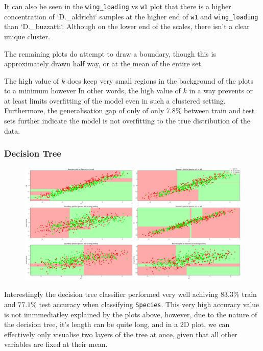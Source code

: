 \documentclass{article}
\begin{document}
It can also be seen in the \texttt{wing_loading} vs \texttt{w1} plot that there is a higher concentration of `D._aldrichi` samples at the higher end of \texttt{w1} and \texttt{wing_loading} than `D._buzzatti`. Although on the lower end of the scales, there isn't a clear unique cluster. 

The remaining plots do attempt to draw a boundary, though this is approximately drawn half way, or at the mean of the entire set.

The high value of $k$ does keep very small regions in the background of the plots to a minimum however In other words, the high value of $k$ in a way prevents or at least limits overfitting of the model even in such a clustered setting. Furthermore, the generalisation gap of only of only $7.8\%$ between train and test sets further indicate the model is not overfitting to the true distribution of the data.

\subsubsection{Decision Tree}


\begin{figure}
    \centering
    \includegraphics{plots/dt_Thorax_decision_boundaries_Species.png}
    \caption{}
    \label{fig:}
\end{figure}

Interestingly the decision tree classifier performed very well achiving $83.3\%$ train and $77.1\%$ test accuracy when classifying \texttt{Species}. This very high accuracy value is not immmediatley explained by the plots above, however, due to the nature of the decision tree, it's length can be quite long, and in a 2D plot, we can effectively only visualise two layers of the tree at once, given that all other variables are fixed at their mean.
\end{document}
